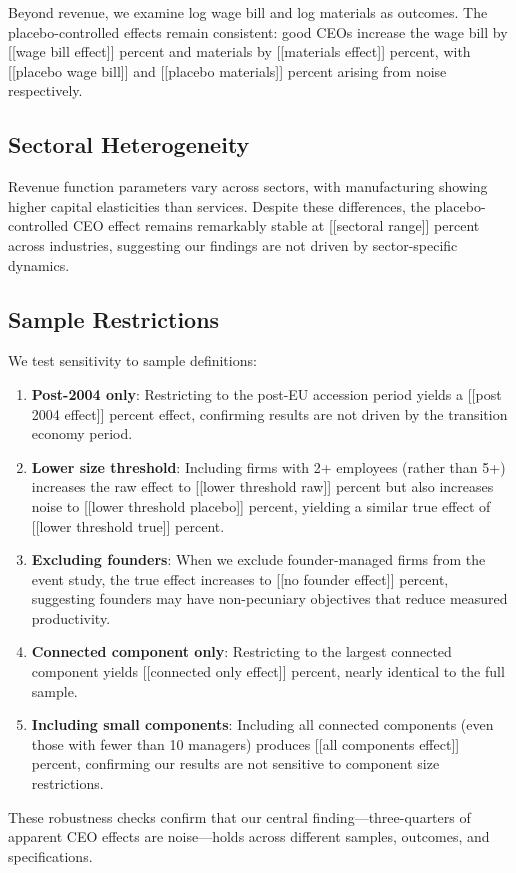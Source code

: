\documentclass[11pt,a4paper]{article}
\begin{document}
Beyond revenue, we examine log wage bill and log materials as outcomes. The placebo-controlled effects remain consistent: good CEOs increase the wage bill by [[wage bill effect]] percent and materials by [[materials effect]] percent, with [[placebo wage bill]] and [[placebo materials]] percent arising from noise respectively.

\subsection{Sectoral Heterogeneity}

Revenue function parameters vary across sectors, with manufacturing showing higher capital elasticities than services. Despite these differences, the placebo-controlled CEO effect remains remarkably stable at [[sectoral range]] percent across industries, suggesting our findings are not driven by sector-specific dynamics.

\subsection{Sample Restrictions}

We test sensitivity to sample definitions:

\begin{enumerate}
\item \textbf{Post-2004 only}: Restricting to the post-EU accession period yields a [[post 2004 effect]] percent effect, confirming results are not driven by the transition economy period.

\item \textbf{Lower size threshold}: Including firms with 2+ employees (rather than 5+) increases the raw effect to [[lower threshold raw]] percent but also increases noise to [[lower threshold placebo]] percent, yielding a similar true effect of [[lower threshold true]] percent.

\item \textbf{Excluding founders}: When we exclude founder-managed firms from the event study, the true effect increases to [[no founder effect]] percent, suggesting founders may have non-pecuniary objectives that reduce measured productivity.

\item \textbf{Connected component only}: Restricting to the largest connected component yields [[connected only effect]] percent, nearly identical to the full sample.

\item \textbf{Including small components}: Including all connected components (even those with fewer than 10 managers) produces [[all components effect]] percent, confirming our results are not sensitive to component size restrictions.
\end{enumerate}

These robustness checks confirm that our central finding—three-quarters of apparent CEO effects are noise—holds across different samples, outcomes, and specifications.
\end{document}
